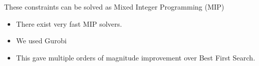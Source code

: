 \documentclass[]{beamer}
\begin{document}
\begin{frame}{These constraints  can be solved as Mixed Integer Programming (MIP)}
	\begin{itemize}
		\item There exist very fast MIP solvers.
		\item We used Gurobi
		\item This gave multiple orders of magnitude improvement over Best First Search.
	\end{itemize}
\end{frame}

\newcommand{\reftitle}{Reference}
\newcommand{\iref}{DT-RAE Ref.}
\newcommand{\ip}{DT-RAE Para.}
\newcommand{\bm}{VAE Mean}
\newcommand{\oracletitle}{Ref.~BOW+Ord.}
\newcommand{\selectiontitle}{Sel.~BOW~(only)}
\newcommand{\twosteptitle}{Sel.~BOW+Ord.}
\newcommand{\bs}{VAE Sample}
\newcommand{\cmark}{\ding{51}}%
\newcommand{\xmark}{\ding{55}}%
\newcommand{\namark}{\ding{54}}
\newcommand{\passmark}{--}

\newcommand{\collenone}{2.3cm}
\newcommand{\collentwo}{6.5cm}
\newcommand{\collenthree}{0.5cm}
\end{document}
